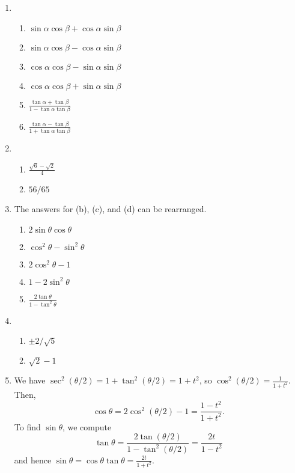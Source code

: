\begin{enumerate}
\item \begin{enumerate}
\item $\sin\alpha\cos\beta + \cos\alpha\sin\beta$
\item $\sin\alpha\cos\beta - \cos\alpha\sin\beta$
\item $\cos\alpha\cos\beta - \sin\alpha\sin\beta$
\item $\cos\alpha\cos\beta + \sin\alpha\sin\beta$
\item $\frac{\tan\alpha + \tan\beta}{1 - \tan\alpha\tan\beta}$
\item $\frac{\tan\alpha - \tan\beta}{1 + \tan\alpha\tan\beta}$
\end{enumerate}
\item \begin{enumerate}
\item $\frac{\sqrt{6} - \sqrt{2}}{4}$
\item $56/65$
\end{enumerate}
\item The answers for (b), (c), and (d) can be rearranged.
\begin{enumerate}
\item $2\sin\theta\cos\theta$
\item $\cos^2\theta - \sin^2\theta$
\item $2\cos^2\theta - 1$
\item $1 - 2\sin^2\theta$
\item $\frac{2\tan\theta}{1 - \tan^2\theta}$
\end{enumerate}
\item \begin{enumerate}
\item $\pm 2/\sqrt{5}$
\item $\sqrt{2} - 1$
\end{enumerate}
\item We have $\sec^2(\theta/2) = 1 + \tan^2(\theta/2) = 1 + t^2$, so $\cos^2(\theta/2) = \frac{1}{1 + t^2}$. Then,
\begin{equation*}
\cos\theta = 2\cos^2(\theta/2) - 1 = \frac{1 - t^2}{1 + t^2}.
\end{equation*}
To find $\sin\theta$, we compute
\begin{equation*}
\tan\theta = \frac{2\tan(\theta/2)}{1 - \tan^2(\theta/2)} = \frac{2t}{1 - t^2}
\end{equation*}
and hence $\sin\theta = \cos\theta\tan\theta = \frac{2t}{1 + t^2}$.\par

\end{enumerate}

